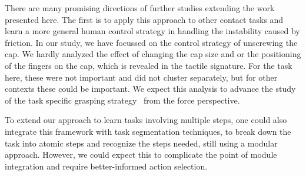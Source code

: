 There are many promising directions of further studies extending the
work presented here. The first is to apply this approach to other
contact tasks and learn a more general human control strategy in
handling the instability caused by friction.
In our study, we have focussed on the control strategy of unscrewing
the cap. We hardly analyzed the effect of changing the cap size and or
the positioning of the fingers on the cap, which is revealed in the
tactile signature. For the task here, these were not important and
did not cluster separately, but for other contexts these could be
important. We expect this analysis to advance the study of the task specific grasping
strategy~\citep{el2013generation,dang2014semantic} from the force perspective.

To extend our approach to learn tasks involving multiple steps, one
could also integrate this framework with task segmentation techniques,
to break down the task into atomic steps and recognize the steps
needed, still using a modular approach. However, we could expect this
to complicate the point of module integration and require
better-informed action selection. %


